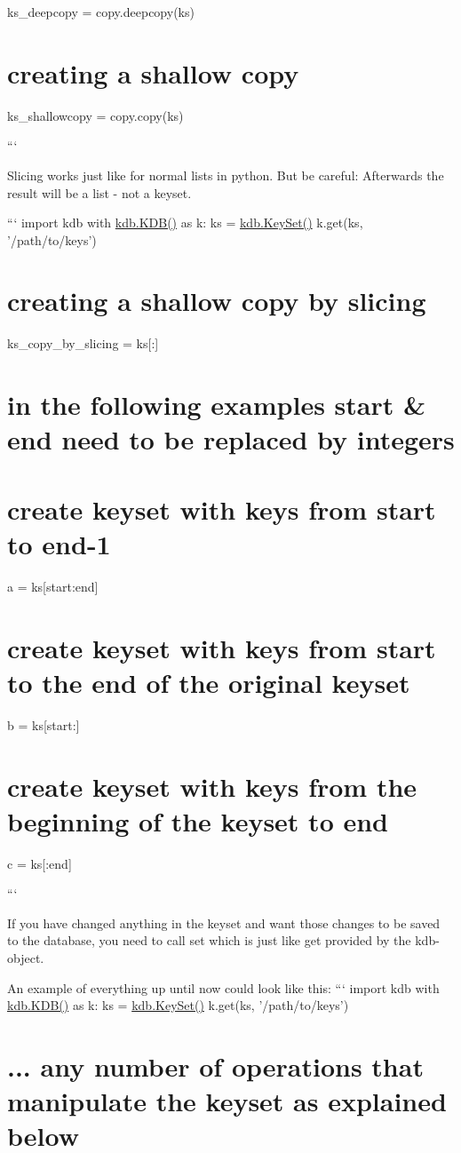 ks\+\_\+deepcopy = copy.\+deepcopy(ks) \section*{creating a shallow copy}

ks\+\_\+shallowcopy = copy.\+copy(ks)

```

Slicing works just like for normal lists in python. But be careful\+: Afterwards the result will be a list -\/ not a keyset.

``` import kdb with \hyperlink{classkdb_1_1KDB}{kdb.\+K\+D\+B()} as k\+: ks = \hyperlink{classkdb_1_1KeySet}{kdb.\+Key\+Set()} k.\+get(ks, '/path/to/keys') \section*{creating a shallow copy by slicing}

ks\+\_\+copy\+\_\+by\+\_\+slicing = ks\mbox{[}\+:\mbox{]} \section*{in the following examples start \& end need to be replaced by integers}

\section*{create keyset with keys from start to end-\/1}

a = ks\mbox{[}start\+:end\mbox{]} \section*{create keyset with keys from start to the end of the original keyset}

b = ks\mbox{[}start\+:\mbox{]} \section*{create keyset with keys from the beginning of the keyset to end}

c = ks\mbox{[}\+:end\mbox{]}

```

If you have changed anything in the keyset and want those changes to be saved to the database, you need to call {\ttfamily set} which is just like {\ttfamily get} provided by the kdb-\/object.

An example of everything up until now could look like this\+: ``` import kdb with \hyperlink{classkdb_1_1KDB}{kdb.\+K\+D\+B()} as k\+: ks = \hyperlink{classkdb_1_1KeySet}{kdb.\+Key\+Set()} k.\+get(ks, '/path/to/keys') \section*{... any number of operations that manipulate the keyset as explained below}


